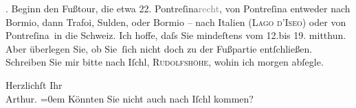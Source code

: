 .{ }Beginn den Fußtour, die etwa
                  22.{ }Pontreſina\textcolor{gray}{recht}, von Pontreſina
               entweder nach Bormio, dann Trafoi, Sulden, oder Bormio – nach Italien (\textsc{Lago d’Iseo}) oder von Pontreſina in die Schweiz. Ich hoffe, daſs Sie mindeſtens vom
                  12.bis 19. mitthun. {\pb}Aber überlegen Sie, ob Sie ſich nicht
               doch zu der Fußpartie entſchließen. Schreiben Sie mir bitte nach Iſchl, \textsc{Rudolfshöhe}, wohin ich morgen abſegle.\pend
           
\pstart
           Herzlichſt Ihr{\\[\baselineskip]}\spacefill\mbox{Arthur.}\pend
           \leftskip=0em{}
\pstart
           \noindent{}Könnten Sie nicht auch nach Iſchl kommen?\pend
           \endnumbering{}
\begin{anhang}
\end{anhang}\newcommand{\dateiname}{L04081}\newcommand{\titel}{Arthur Schnitzler an Gustav Schwarzkopf, 30. 7. 1900}\newcommand{\editorInnen}{Herausgegeben von Jahnke, SelmaMüller, Martin Anton}
